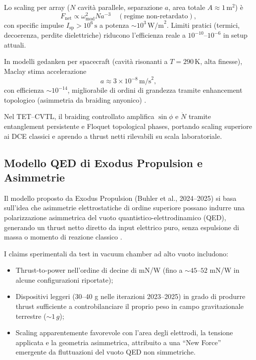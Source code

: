 \documentclass[11pt,a4paper]{article}
\let\oldcite\cite
\renewcommand{\cite}{\protect\oldcite}
\theoremstyle{plain}
\theoremstyle{definition}
\begin{document}
Lo scaling per array ($N$ cavità parallele, separazione $a$, area totale $A \approx 1\,\mathrm{m}^2$) è
\begin{equation}
F_{\mathrm{net}} \propto \omega_{\mathrm{mod}}^2 N a^{-3} \quad (\text{regime non-retardato}),
\label{eq:dce_scaling}
\end{equation}
con specific impulse $I_{\mathrm{sp}} > 10^6\,\mathrm{s}$ a potenza $\sim 10^3\,\mathrm{W/m}^2$. Limiti pratici (termici, decoerenza, perdite dielettriche) riducono l'efficienza reale a $10^{-10}$–$10^{-6}$ in setup attuali.

In modelli gedanken per spacecraft (cavità risonanti a $T=290\,\mathrm{K}$, alta finesse), Maclay stima accelerazione
\begin{equation}
a \approx 3 \times 10^{-8}\,\mathrm{m/s}^2,
\label{eq:maclay_accel}
\end{equation}
con efficienza $\sim 10^{-14}$, migliorabile di ordini di grandezza tramite enhancement topologico (asimmetria da braiding anyonico) \cite{Maclay2007}.

Nel TET--CVTL, il braiding controllato amplifica $\sin\phi$ e $\dot{N}$ tramite entanglement persistente e Floquet topological phases, portando scaling superiore ai DCE classici e aprendo a thrust netti rilevabili su scala laboratoriale.

\subsection{Modello QED di Exodus Propulsion e Asimmetrie}

Il modello proposto da Exodus Propulsion (Buhler et al., 2024--2025) si basa sull'idea che asimmetrie elettrostatiche di ordine superiore possano indurre una polarizzazione asimmetrica del vuoto quantistico-elettrodinamico (QED), generando un thrust netto diretto da input elettrico puro, senza espulsione di massa o momento di reazione classico \cite{BuhlerAPEC2025, BuhlerDebrief2024}. 

I claims sperimentali da test in vacuum chamber ad alto vuoto includono:
\begin{itemize}
    \item Thrust-to-power nell'ordine di decine di mN/W (fino a $\sim 45$--$52$ mN/W in alcune configurazioni riportate);
    \item Dispositivi leggeri (30--40 g nelle iterazioni 2023--2025) in grado di produrre thrust sufficiente a controbilanciare il proprio peso in campo gravitazionale terrestre ($\sim 1\,g$);
    \item Scaling apparentemente favorevole con l'area degli elettrodi, la tensione applicata e la geometria asimmetrica, attribuito a una ``New Force'' emergente da fluttuazioni del vuoto QED non simmetriche.
\end{itemize}
\end{document}
